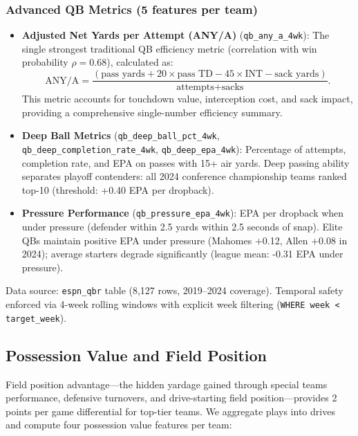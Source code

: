 \subsubsection{Advanced QB Metrics (5 features per team)}

\begin{itemize}
  \item \textbf{Adjusted Net Yards per Attempt (ANY/A)} (\texttt{qb\_any\_a\_4wk}): The single strongest traditional QB efficiency metric (correlation with win probability $\rho = 0.68$), calculated as:
  \begin{equation}
    \text{ANY/A} = \frac{(\text{pass yards} + 20 \times \text{pass TD} - 45 \times \text{INT} - \text{sack yards})}{\text{attempts} + \text{sacks}}.
    \label{eq:any-a}
  \end{equation}
  This metric accounts for touchdown value, interception cost, and sack impact, providing a comprehensive single-number efficiency summary.

  \item \textbf{Deep Ball Metrics} (\texttt{qb\_deep\_ball\_pct\_4wk}, \texttt{qb\_deep\_\allowbreak completion\_rate\_4wk}, \texttt{qb\_deep\_epa\_4wk}): Percentage of attempts, completion rate, and EPA on passes with 15+ air yards. Deep passing ability separates playoff contenders: all 2024 conference championship teams ranked top-10 (threshold: +0.40 EPA per dropback).

  \item \textbf{Pressure Performance} (\texttt{qb\_pressure\_epa\_4wk}): EPA per dropback when under pressure (defender within 2.5 yards within 2.5 seconds of snap). Elite QBs maintain positive EPA under pressure (Mahomes +0.12, Allen +0.08 in 2024); average starters degrade significantly (league mean: -0.31 EPA under pressure).
\end{itemize}

Data source: \texttt{espn\_qbr} table (8,127 rows, 2019--2024 coverage). Temporal safety enforced via 4-week rolling windows with explicit week filtering (\texttt{WHERE week < target\_week}).

\subsection{Possession Value and Field Position}
\label{subsec:possession-value}

Field position advantage---the hidden yardage gained through special teams performance, defensive turnovers, and drive-starting field position---provides 2 points per game differential for top-tier teams. We aggregate plays into drives and compute four possession value features per team:

